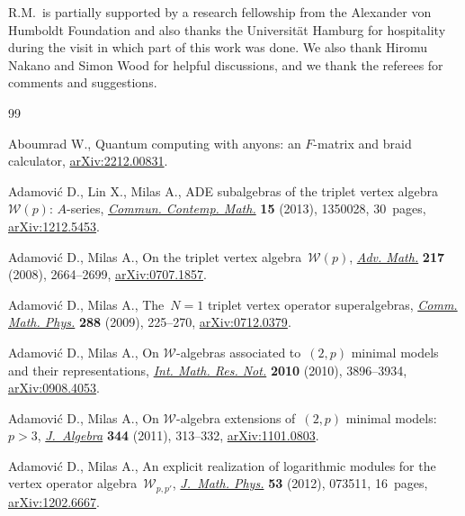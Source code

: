 \documentclass[pdftex]{sigma}
\numberwithin{equation}{section}
\theoremstyle{definition}
\begin{document}
R.M.\ is partially supported by a research fellowship from the Alexander von Humboldt Foundation and also thanks the Universit\"{a}t Hamburg for hospitality during the visit in which part of this work was done. We also thank Hiromu Nakano and Simon Wood for helpful discussions, and we thank the referees for comments and suggestions.

\begin{thebibliography}{99}
\footnotesize\itemsep=0pt

Aboumrad W., Quantum computing with anyons: an $F$-matrix and braid calculator,
 \href{http://arxiv.org/abs/2212.00831}{arXiv:2212.00831}.

Adamovi\'c D., Lin X., Milas A., A{DE} subalgebras of the triplet vertex
 algebra~{$\mathcal{W}(p)$}: {$A$}-series,
 \href{https://doi.org/10.1142/S0219199713500284}{\textit{Commun. Contemp.
 Math.}} \textbf{15} (2013), 1350028, 30~pages,
 \href{http://arxiv.org/abs/1212.5453}{arXiv:1212.5453}.

Adamovi\'c D., Milas A., On the triplet vertex algebra~$\mathcal{W}(p)$,
 \href{https://doi.org/10.1016/j.aim.2007.11.012}{\textit{Adv. Math.}}
 \textbf{217} (2008), 2664--2699,
 \href{http://arxiv.org/abs/0707.1857}{arXiv:0707.1857}.

Adamovi\'c D., Milas A., The~{$N=1$} triplet vertex operator superalgebras,
 \href{https://doi.org/10.1007/s00220-009-0735-2}{\textit{Comm. Math. Phys.}}
 \textbf{288} (2009), 225--270,
 \href{http://arxiv.org/abs/0712.0379}{arXiv:0712.0379}.

Adamovi\'c D., Milas A., On {$\mathcal{W}$}-algebras associated to~{$(2,p)$}
 minimal models and their representations,
 \href{https://doi.org/10.1093/imrn/rnq016}{\textit{Int. Math. Res. Not.}}
 \textbf{2010} (2010), 3896--3934,
 \href{http://arxiv.org/abs/0908.4053}{arXiv:0908.4053}.

Adamovi\'c D., Milas A., On {$\mathcal{W}$}-algebra extensions of~{$(2,p)$}
 minimal models: {$p>3$},
 \href{https://doi.org/10.1016/j.jalgebra.2011.07.006}{\textit{J.~Algebra}}
 \textbf{344} (2011), 313--332,
 \href{http://arxiv.org/abs/1101.0803}{arXiv:1101.0803}.

Adamovi\'c D., Milas A., An explicit realization of logarithmic modules for the
 vertex operator algebra~$\mathcal{W}_{p,p'}$,
 \href{https://doi.org/10.1063/1.4736424}{\textit{J.~Math. Phys.}} \textbf{53}
 (2012), 073511, 16~pages,
 \href{http://arxiv.org/abs/1202.6667}{arXiv:1202.6667}.


\end{thebibliography}
\end{document}
